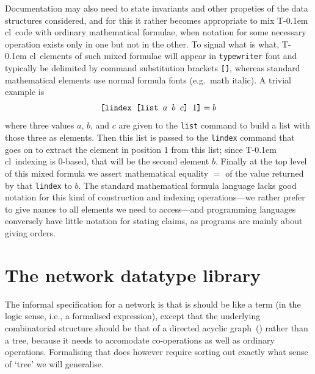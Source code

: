 \documentclass{article}
\theoremstyle{definition}
\newcommand{\Tcl}{T\kern-0.1em cl}
\begin{document}
Documentation may also need to state invariants and other propeties 
of the data structures considered, and for this it rather becomes 
appropriate to mix \Tcl\ code with ordinary mathematical formulae, 
when notation for some necessary operation exists only in one but 
not in the other. To signal what is what, \Tcl\ elements of such 
mixed formulae will appear in \texttt{typewriter} font and typically 
be delimited by command substitution brackets \texttt{[]}, whereas 
standard mathematical elements use normal formula fonts (e.g.~math 
italic). A trivial example is
\[
  \text{\ttfamily [lindex [list $a$ $b$ $c$] $1$]} = b
\]
where three values $a$, $b$, and $c$ are given to the \texttt{list} 
command to build a list with those three as elements. Then this list 
is passed to the \texttt{lindex} command that goes on to extract the 
element in position $1$ from this list; since \Tcl\ indexing is 
$0$-based, that will be the second element $b$. Finally at the top 
level of this mixed formula we assert mathematical equality $=$ of the 
value returned by that \texttt{lindex} to $b$. The standard 
mathematical formula language lacks good notation for this kind of 
construction and indexing operations---we rather prefer to give names 
to all elements we need to access---and programming languages 
conversely have little notation for stating claims, as programs are 
mainly about giving orders.



\section{The network datatype library}

The informal specification for a network is that is should be like a 
term (in the logic sense, i.e., a formalised expression), except that 
the underlying combinatorial structure should be that of a directed 
acyclic graph~() rather than a tree, because it needs to 
accomodate co-operations as well as ordinary operations. Formalising 
that does however require sorting out exactly what sense of `tree' we 
will generalise.
\end{document}
